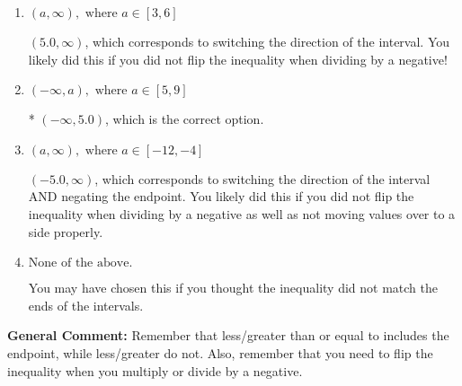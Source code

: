 \documentclass{extbook}[14pt]
\begin{document}
\begin{enumerate}
{\begin{enumerate}[label=\Alph*.]
 $(-\infty, -5.0)$, which corresponds to negating the endpoint of the solution.
\item \( (a, \infty), \text{ where } a \in [3, 6] \)

 $(5.0, \infty)$, which corresponds to switching the direction of the interval. You likely did this if you did not flip the inequality when dividing by a negative!
\item \( (-\infty, a), \text{ where } a \in [5, 9] \)

* $(-\infty, 5.0)$, which is the correct option.
\item \( (a, \infty), \text{ where } a \in [-12, -4] \)

 $(-5.0, \infty)$, which corresponds to switching the direction of the interval AND negating the endpoint. You likely did this if you did not flip the inequality when dividing by a negative as well as not moving values over to a side properly.
\item \( \text{None of the above}. \)

You may have chosen this if you thought the inequality did not match the ends of the intervals.
\end{enumerate}

\textbf{General Comment:} Remember that less/greater than or equal to includes the endpoint, while less/greater do not. Also, remember that you need to flip the inequality when you multiply or divide by a negative.
}
\end{enumerate}
\end{document}
